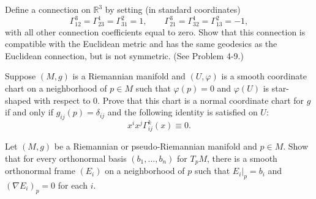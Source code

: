 \begin{exercise}
\label{prob:nonsymmetric-euclidean-connection}

Define a connection on $\mathbb{R}^3$ by setting (in standard coordinates)
\[
\Gamma_{12}^3 = \Gamma_{23}^1 = \Gamma_{31}^2 = 1, \qquad
\Gamma_{21}^3 = \Gamma_{32}^1 = \Gamma_{13}^2 = -1,
\]
with all other connection coefficients equal to zero. Show that this connection is compatible with the Euclidean metric and has the same geodesics as the Euclidean connection, but is not symmetric. (See Problem 4-9.)
\end{exercise}

\begin{exercise}
\label{prob:normal-coordinates-chart}

Suppose $(M, g)$ is a Riemannian manifold and $(U, \varphi)$ is a smooth coordinate chart on a neighborhood of $p \in M$ such that $\varphi(p) = 0$ and $\varphi(U)$ is star-shaped with respect to $0$. Prove that this chart is a normal coordinate chart for $g$ if and only if $g_{ij}(p) = \delta_{ij}$ and the following identity is satisfied on $U$:
\[
x^i x^j \Gamma^k_{ij}(x) \equiv 0.
\]
\end{exercise}

\begin{exercise}
\label{prob:orthonormal-frame-zero-covariant-derivative}

Let $(M,g)$ be a Riemannian or pseudo-Riemannian manifold and $p \in M$. Show that for every orthonormal basis $(b_1,\ldots,b_n)$ for $T_pM$, there is a smooth orthonormal frame $(E_i)$ on a neighborhood of $p$ such that $E_i|_p = b_i$ and $(\nabla E_i)_p = 0$ for each $i$.
\end{exercise}

